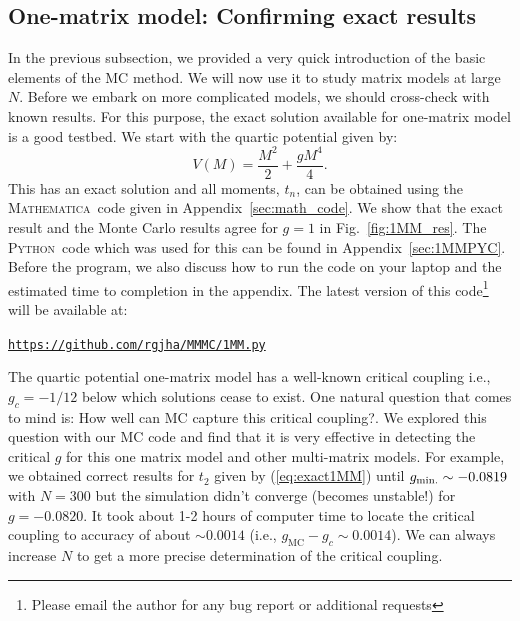 \documentclass[letter,11pt]{article}
\newcommand{\MA}{\textsc{Mathematica}}
\newcommand{\PY}{\textsc{Python}}
\begin{document}
\subsection{One-matrix model: Confirming exact results} 
In the previous subsection, we provided a very quick introduction of the basic elements of the MC method. We will now use it to study matrix models at large $N$. Before we embark on more complicated models, we should cross-check with known results. For this purpose, the exact solution available for one-matrix model is a good testbed. We start with the quartic potential given by:
\begin{equation}
	V(M) = \frac{M^2}{2} + \frac{gM^4}{4}.  
\end{equation}
This has an exact solution and all moments, $t_{n}$, can be obtained using the \MA~code given in  Appendix~\ref{sec:math_code}. We show that the exact result and the Monte Carlo results agree for $g=1$ in 
Fig.~\ref{fig:1MM_res}. The \PY~code which was used for this can be found in Appendix~\ref{sec:1MMPYC}. Before the program, we also discuss how to run the code on your laptop and the estimated time to completion in the appendix. The latest version of this 
code\footnote{Please email the author for any bug report or additional requests} will be available at:
\begin{center} \texttt{\href{https://github.com/rgjha/MMMC/blob/main/1MM.py}{https://github.com/rgjha/MMMC/1MM.py}} \end{center} 
The quartic potential one-matrix model has a well-known critical coupling i.e., $ g_{c} = -1/12$ below which solutions cease to exist. One natural question that comes to mind is: How well can MC capture this critical coupling?. We explored this question with our MC code and find that it is very effective in detecting the critical $g$ for this one matrix model and other multi-matrix models. 
For example, we obtained correct results for $t_{2}$ given by (\ref{eq:exact1MM}) 
until $g_{\rm{min.}} \sim -0.0819$ with $N=300$ but the simulation didn't converge (becomes 
unstable!) for $g = -0.0820$. It took about 1-2 hours of computer time to 
locate the critical coupling to accuracy of about $\sim 0.0014$ (i.e., $g_{\text{MC}} - g_{c} \sim 0.0014$). We can always increase $N$ to get a more precise determination of the critical coupling. 
\end{document}
